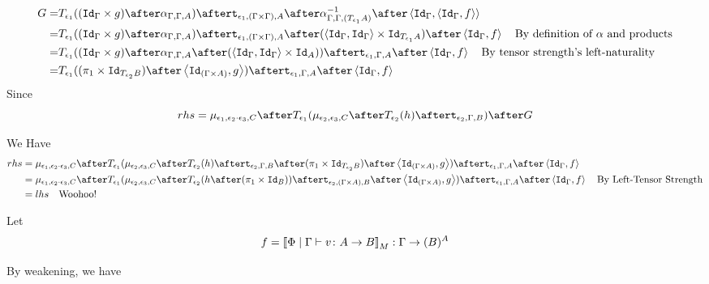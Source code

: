 \documentclass{report}
\begin{document}
\begin{equation}
    \begin{split}
        G = & \T{\e_1}{((\idg\times g)\after \alpha_{\G, \G, A})} \after \tstrength{\e_1}{(\G\times\G)}{A}\after\alpha^{-1}_{\G, \G, (\T{\e_1}{A})}\after\pr{\idg}{\pr{\idg}{f}} \\
        = & \T{\e_1}{((\idg\times g)\after \alpha_{\G, \G, A})} \after \tstrength{\e_1}{(\G\times\G)}{A}\after(\pr{\idg}{\idg}\times \Id{\T{\e_1}{A}})\after\pr{\idg}{f}\qt{By definition of $\alpha$ and products}\\
        = & \T{\e_1}{((\idg\times g)\after \alpha_{\G, \G, A}\after(\pr{\idg}{\idg}\times \Id{A}))}\after\tstrength{\e_1}{\G}{A}\after\pr{\idg}{f}\qt{By tensor strength's left-naturality}\\
        = & \T{\e_1}{((\p\times\Id{\T{\e_2}{B}})\after\pr{\Id{(\G\times A)}}{g})}\after\tstrength{\e_1}{\G}{A}\after\pr{\idg}{f}
    \end{split}
\end{equation}
Since 
\begin{equation}
rhs = \bind{\e_1}{\e_2\dot\e_3}{C}\after\T{\e_1}{(\bind{\e_2}{\e_3}{C}\after \T{\e_2}{(h)} \after \tstrength{\e_2}{\G}{B})}\after G
\end{equation}

We Have
\begin{equation}
\begin{split}
    rhs ={} & \bind{\e_1}{\e_2\dot\e_3}{C}\after\T{\e_1}{(\bind{\e_2}{\e_3}{C}\after \T{\e_2}{(h)} \after \tstrength{\e_2}{\G}{B}\after(\p\times\Id{\T{\e_2}{B}})\after\pr{\Id{(\G\times A)}}{g})}\after\tstrength{\e_1}{\G}{A}\after\pr{\idg}{f}\\
    ={} & \bind{\e_1}{\e_2\dot\e_3}{C}\after\T{\e_1}{(\bind{\e_2}{\e_3}{C}\after \T{\e_2}{(h \after (\p\times\Id{B}))}\after\tstrength{\e_2}{(\G\times A)}{B}\after\pr{\Id{(\G\times A)}}{g})}\after\tstrength{\e_1}{\G}{A}\after\pr{\idg}{f}\qt{By Left-Tensor Strength}\\
    ={} & lhs \qt{Woohoo!}
\end{split}
\end{equation}


Let 
\begin{equation}
    f = {\bf [\![}\Phi\mid\Gamma \vdash v \colon A\rightarrow B{\bf ]\!]}_M : \Gamma \rightarrow (B)^{A}
\end{equation}

By weakening, we have
\end{document}
